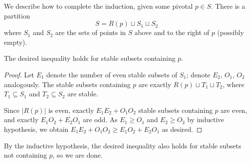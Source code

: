We describe how to complete the induction,
given some pivotal $p \in S$.
There is a partition
\[ S = R(p) \sqcup S_1 \sqcup S_2 \]
where $S_1$ and $S_2$ are the sets of points in $S$
above and to the right of $p$
(possibly empty).

\begin{claim*}
  The desired inequality holds for stable subsets containing $p$.
\end{claim*}
\begin{proof}
  Let $E_1$ denote the number of even stable subsets of $S_1$;
  denote $E_2$, $O_1$, $O_2$ analogously.
  The stable subsets containing $p$ are exactly $R(p) \sqcup T_1 \sqcup T_2$,
  where $T_1 \subseteq S_1$ and $T_2 \subseteq S_2$ are stable.

  Since $|R(p)|$ is even,
  exactly $E_1E_2 + O_1O_2$ stable subsets containing $p$ are even,
  and exactly $E_1O_2 + E_2O_1$ are odd.
  As $E_1 \ge O_1$ and $E_2 \ge O_2$ by inductive hypothesis,
  we obtain $E_1E_2 + O_1O_2 \ge E_1O_2 + E_2O_1$ as desired.
\end{proof}

By the inductive hypothesis, the desired inequality also holds
for stable subsets not containing $p$, so we are done.
